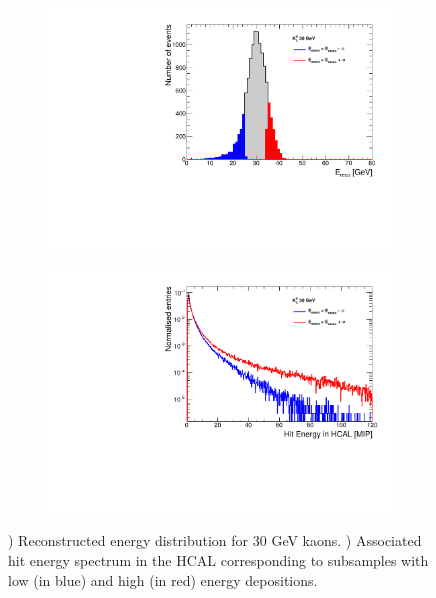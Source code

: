 \begin{figure}[htbp!]
  \centering
  \begin{subfigure}[t]{0.45\textwidth}
    \centering
    \includegraphics[width=1\linewidth]{../Thesis_Plots/ILD/AdditionalPlots/Plots/EnergySum_100ns_30GeV.pdf}
    \caption{} \label{fig:Esum30_100ns}
  \end{subfigure}
  \hfill
  \begin{subfigure}[t]{0.45\textwidth}
    \centering
    \includegraphics[width=1\linewidth]{../Thesis_Plots/ILD/AdditionalPlots/Plots/HitEnergySpectra_100ns_30GeV.pdf}
    \caption{} \label{fig:HitSpectra30_100ns}
  \end{subfigure}
  \caption{) Reconstructed energy distribution for 30 GeV kaons. ) Associated hit energy spectrum in the HCAL corresponding to subsamples with low (in blue) and high (in red) energy depositions.} \label{fig:Response30GeV}
\end{figure}

